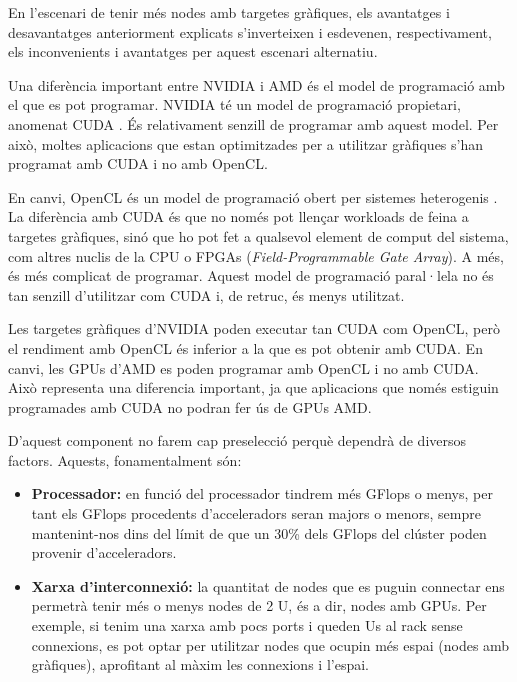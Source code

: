 En l'escenari de tenir més nodes amb targetes gràfiques, els avantatges i desavantatges anteriorment explicats s'inverteixen i esdevenen, respectivament, els inconvenients i avantatges per aquest escenari alternatiu.

Una diferència important entre NVIDIA i AMD és el model de programació amb el que es pot programar. NVIDIA té un model de programació propietari, anomenat CUDA \cite{gpu_cuda}. És relativament senzill de programar amb aquest model. Per això, moltes aplicacions que estan optimitzades per a utilitzar gràfiques s'han programat amb CUDA i no amb OpenCL.

En canvi, OpenCL és un model de programació obert per sistemes heterogenis \cite{gpu_opencl}. La diferència amb CUDA és que no només pot llençar workloads de feina a targetes gràfiques, sinó que ho pot fet a qualsevol element de comput del sistema, com altres nuclis de la CPU o FPGAs (\textit{Field-Programmable Gate Array}). A més, és més complicat de programar.
Aquest model de programació paral·lela no és tan senzill d'utilitzar com CUDA i, de retruc, és menys utilitzat.

Les targetes gràfiques d'NVIDIA poden executar tan CUDA com OpenCL, però el rendiment amb OpenCL és inferior a la que es pot obtenir amb CUDA. En canvi, les GPUs d'AMD es poden programar amb OpenCL i no amb CUDA. 
Això representa una diferencia important, ja que aplicacions que només estiguin programades amb CUDA no podran fer ús de GPUs AMD.

D'aquest component no farem cap preselecció perquè dependrà de diversos factors. Aquests, fonamentalment són: 
\begin{itemize}
    \item \textbf{Processador:} en funció del processador tindrem més GFlops o menys, per tant els GFlops procedents d'acceleradors seran majors o menors, sempre mantenint-nos dins del límit de que un 30\% dels GFlops del clúster poden provenir d'acceleradors.
    \item \textbf{Xarxa d'interconnexió:} la quantitat de nodes que es puguin connectar ens permetrà tenir més o menys nodes de 2 U, és a dir, nodes amb GPUs. Per exemple, si tenim una xarxa amb pocs ports i queden Us al rack sense connexions, es pot optar per utilitzar nodes que ocupin més espai (nodes amb gràfiques), aprofitant al màxim les connexions i l'espai.
\end{itemize}


